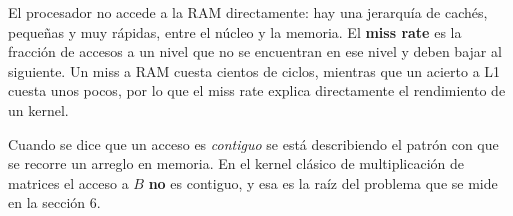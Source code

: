 El procesador no accede a la RAM directamente: hay una jerarquía de cachés, pequeñas y muy rápidas, entre el núcleo y la memoria. El \textbf{miss rate} es la fracción de accesos a un nivel que no se encuentran en ese nivel y deben bajar al siguiente. Un miss a RAM cuesta cientos de ciclos, mientras que un acierto a L1 cuesta unos pocos, por lo que el miss rate explica directamente el rendimiento de un kernel.

Cuando se dice que un acceso es \emph{contiguo} se está describiendo el patrón con que se recorre un arreglo en memoria. En el kernel clásico de multiplicación de matrices el acceso a $B$ \textbf{no} es contiguo, y esa es la raíz del problema que se mide en la sección 6.
